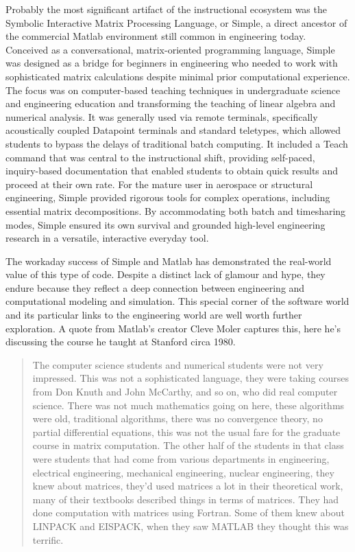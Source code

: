 Probably the most significant artifact of the instructional ecosystem was the Symbolic Interactive Matrix Processing Language, or Simple, a direct ancestor of the commercial Matlab environment still common in engineering today. Conceived as a conversational, matrix-oriented programming language, Simple was designed as a bridge for beginners in engineering who needed to work with sophisticated matrix calculations despite minimal prior computational experience. The focus was on computer-based teaching techniques in undergraduate science and engineering education and transforming the teaching of linear algebra and numerical analysis. It was generally used via remote terminals, specifically acoustically coupled Datapoint terminals and standard teletypes, which allowed students to bypass the delays of traditional batch computing. It included a Teach command that was central to the instructional shift, providing self-paced, inquiry-based documentation that enabled students to obtain quick results and proceed at their own rate. For the mature user in aerospace or structural engineering, Simple provided rigorous tools for complex operations, including essential matrix decompositions. By accommodating both batch and timesharing modes, Simple ensured its own survival and grounded high-level engineering research in a versatile, interactive everyday tool. 

The workaday success of Simple and Matlab has demonstrated the real-world value of this type of code. Despite a distinct lack of glamour and hype, they endure because they reflect a deep connection between engineering and computational modeling and simulation. This special corner of the software world and its particular links to the engineering world are well worth further exploration. A quote from Matlab’s creator Cleve Moler captures this, here he's discussing the course he taught at Stanford circa 1980.

\begin{quotation}
The computer science students and numerical students were not very impressed. This was not a sophisticated language, they were taking courses from Don Knuth and John McCarthy, and so on, who did real computer science. There was not much mathematics going on here, these algorithms were old, traditional algorithms, there was no convergence theory, no partial differential equations, this was not the usual fare for the graduate course in matrix computation. The other half of the students in that class were students that had come from various departments in engineering, electrical engineering, mechanical engineering, nuclear engineering, they knew about matrices, they’d used matrices a lot in their theoretical work, many of their textbooks described things in terms of matrices. They had done computation with matrices using Fortran. Some of them knew about LINPACK and EISPACK, when they saw MATLAB they thought this was terrific.
\end{quotation}


